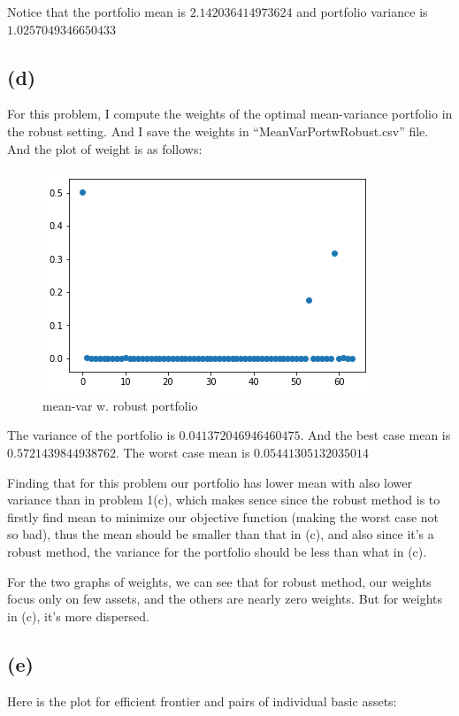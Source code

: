 \documentclass[letterpaper,11pt]{article}
\begin{document}
\begin{spacing}{1.2}
Notice that the portfolio mean is $2.142036414973624$ and portfolio variance is $1.0257049346650433$

\subsection*{(d)}
For this problem, I compute the weights of the optimal mean-variance portfolio in the robust setting. And I save the weights in ``MeanVarPortwRobust.csv'' file. And the plot of weight is as follows:

\begin{figure}[h] %
\centering
\includegraphics[scale=0.5]{1(d).png}
\caption{mean-var w. robust portfolio}
\label{fig:label}
\end{figure}

The variance of the portfolio is $0.041372046946460475$. And the best case mean is $0.5721439844938762$. The worst case mean is $0.05441305132035014$


Finding that for this problem our portfolio has lower mean with also lower variance than in problem 1(c), which makes sence since the robust method is to firstly find mean to minimize our objective function (making the worst case not so bad), thus the mean should be smaller than that in (c), and also since it's a robust method, the variance for the portfolio should be less than what in (c).

For the two graphs of weights, we can see that for robust method, our weights focus only on few assets, and the others are nearly zero weights. But for weights in (c), it's more dispersed. 

\subsection*{(e)}

Here is the plot for efficient frontier and pairs of individual basic assets:


\end{spacing}
\end{document}
